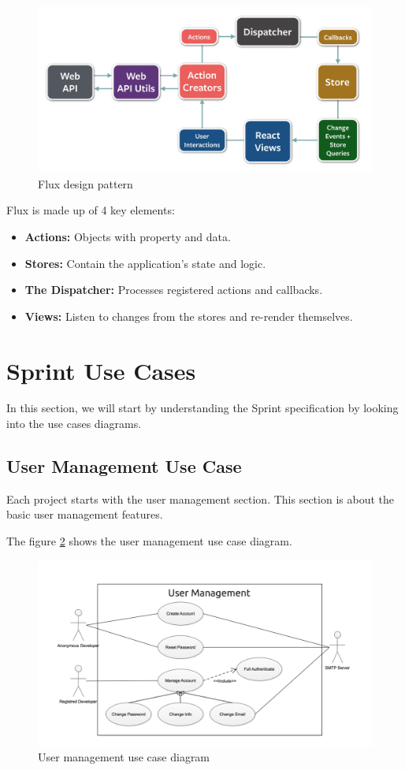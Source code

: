 \begin{spacing}{1.2}
\begin{figure}[H]\centering
\includegraphics[scale=0.3]{Fluxdesignpattern.png}
\caption{Flux design pattern}
\label{usermanagementusecase}
\end{figure}

Flux is made up of 4 key elements:

\begin{itemize}
	\item \textbf{Actions:} Objects with property and data.
	\item \textbf{Stores:} Contain the application's state and logic.
	\item \textbf{The Dispatcher:} Processes registered actions and callbacks.
	\item \textbf{Views:} Listen to changes from the stores and re-render themselves.
\end{itemize}

\section{Sprint Use Cases}
In this section, we will start by understanding the Sprint specification by looking into the use cases diagrams.

\subsection{User Management Use Case}
Each project starts with the user management section. This section is about the basic user management features.

The figure \ref{usermanagementusecase} shows the user management use case diagram.
\begin{figure}[H]\centering
\includegraphics[scale=0.3]{userusecase.png}
\caption{User management use case diagram}
\label{usermanagementusecase}
\end{figure}



\end{spacing}

